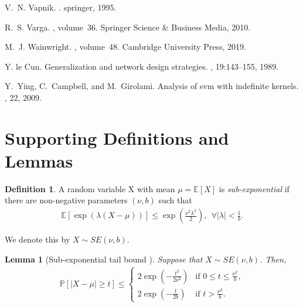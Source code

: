 \documentclass{article}
\theoremstyle{plain}
\newtheorem{lemma}{Lemma}
\theoremstyle{definition}
\newtheorem{definition}{Definition}
\theoremstyle{remark}
\begin{document}
\begin{thebibliography}{10}
V.~N. Vapnik.
.
\newblock springer, 1995.

R.~S. Varga.
, volume~36.
\newblock Springer Science \& Business Media, 2010.

M.~J. Wainwright.
,
  volume~48.
\newblock Cambridge University Press, 2019.

{Y. le Cun}.
\newblock Generalization and network design strategies.
, 19:143--155, 1989.

Y.~Ying, C.~Campbell, and M.~Girolami.
\newblock Analysis of svm with indefinite kernels.
, 22, 2009.

\end{thebibliography}



\newpage
\appendix

\section{Supporting Definitions and Lemmas}
\begin{definition}\label{eqn:def_exp}
A random variable X with mean $\mu = \mathbb{E}[X]$ is \textit{sub-exponential} if there are non-negative parameters $(\nu, b)$ such that \cite{wainwright2019high}
\begin{align*}
    \mathbb{E}[\exp{(\lambda (X-\mu))}] \le \exp(\frac{\nu^2 \lambda^2}{2}), \ \ \forall |\lambda| < \frac{1}{b}.
\end{align*}
\end{definition}
We denote this by $X \sim SE(\nu,b)$.

\begin{lemma}[Sub-exponential tail bound \cite{wainwright2019high}]
Suppose that $X\sim SE(\nu,b)$. Then,
\begin{align*}
    \mathbb{P}[|X - \mu| \geq t] \le
    \begin{cases}
    2\exp(-\frac{t^2}{2 \nu^2}) & \text{if } 0 \le t \le \frac{\nu^2}{b},\\
    2\exp(-\frac{t}{2b}) & \text{if } t > \frac{\nu^2}{b}.
    \end{cases}
\end{align*}
\label{lem:exp_tail}
\end{lemma}
\end{document}
